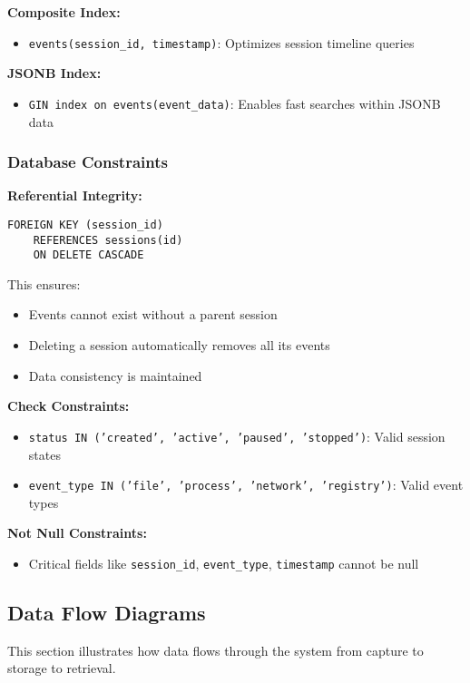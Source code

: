 \textbf{Composite Index:}
\begin{itemize}
    \item \texttt{events(session\_id, timestamp)}: Optimizes session timeline queries
\end{itemize}

\textbf{JSONB Index:}
\begin{itemize}
    \item \texttt{GIN index on events(event\_data)}: Enables fast searches within JSONB data
\end{itemize}

\subsubsection{Database Constraints}

\textbf{Referential Integrity:}
\begin{verbatim}
FOREIGN KEY (session_id) 
    REFERENCES sessions(id) 
    ON DELETE CASCADE
\end{verbatim}

This ensures:
\begin{itemize}
    \item Events cannot exist without a parent session
    \item Deleting a session automatically removes all its events
    \item Data consistency is maintained
\end{itemize}

\textbf{Check Constraints:}
\begin{itemize}
    \item \texttt{status IN ('created', 'active', 'paused', 'stopped')}: Valid session states
    \item \texttt{event\_type IN ('file', 'process', 'network', 'registry')}: Valid event types
\end{itemize}

\textbf{Not Null Constraints:}
\begin{itemize}
    \item Critical fields like \texttt{session\_id}, \texttt{event\_type}, \texttt{timestamp} cannot be null
\end{itemize}

\subsection{Data Flow Diagrams}

This section illustrates how data flows through the system from capture to storage to retrieval.

